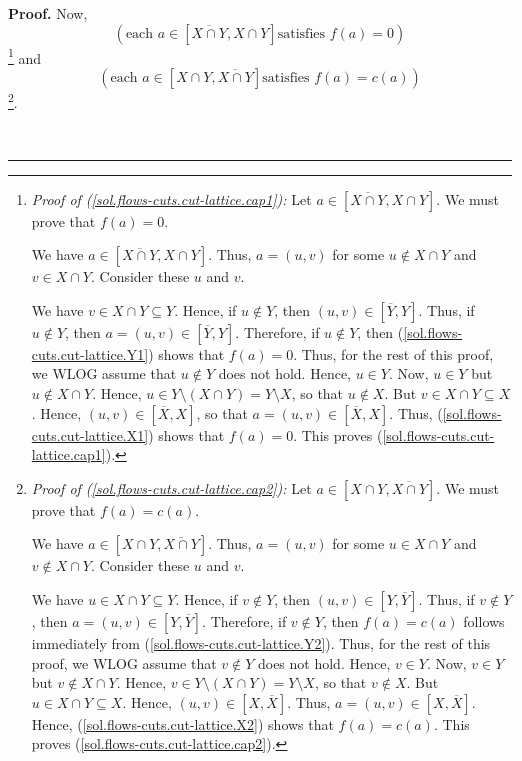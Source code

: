 \documentclass[numbers=enddot,12pt,final,onecolumn,notitlepage]{scrartcl}%
\theoremstyle{definition}
\newenvironment{proof}[1][Proof]{\noindent\textbf{#1.} }{\ \rule{0.5em}{0.5em}}
\begin{document}
\begin{proof}
Now,
\begin{equation}
\left(  \text{each }a\in\left[  \overline{X\cap Y},X\cap Y\right]  \text{
satisfies }f\left(  a\right)  =0\right)
\label{sol.flows-cuts.cut-lattice.cap1}%
\end{equation}
\footnote{\textit{Proof of (\ref{sol.flows-cuts.cut-lattice.cap1}):} Let
$a\in\left[  \overline{X\cap Y},X\cap Y\right]  $. We must prove that
$f\left(  a\right)  =0$.
\par
We have $a\in\left[  \overline{X\cap Y},X\cap Y\right]  $. Thus, $a=\left(
u,v\right)  $ for some $u\notin X\cap Y$ and $v\in X\cap Y$. Consider these
$u$ and $v$.
\par
We have $v\in X\cap Y\subseteq Y$. Hence, if $u\notin Y$, then $\left(
u,v\right)  \in\left[  \overline{Y},Y\right]  $. Thus, if $u\notin Y$, then
$a=\left(  u,v\right)  \in\left[  \overline{Y},Y\right]  $. Therefore, if
$u\notin Y$, then (\ref{sol.flows-cuts.cut-lattice.Y1}) shows that $f\left(
a\right)  =0$. Thus, for the rest of this proof, we WLOG assume that $u\notin
Y$ does not hold. Hence, $u\in Y$. Now, $u\in Y$ but $u\notin X\cap Y$. Hence,
$u\in Y\setminus\left(  X\cap Y\right)  =Y\setminus X$, so that $u\notin X$.
But $v\in X\cap Y\subseteq X$. Hence, $\left(  u,v\right)  \in\left[
\overline{X},X\right]  $, so that $a=\left(  u,v\right)  \in\left[
\overline{X},X\right]  $. Thus, (\ref{sol.flows-cuts.cut-lattice.X1}) shows
that $f\left(  a\right)  =0$. This proves
(\ref{sol.flows-cuts.cut-lattice.cap1}).} and%
\begin{equation}
\left(  \text{each }a\in\left[  X\cap Y,\overline{X\cap Y}\right]  \text{
satisfies }f\left(  a\right)  =c\left(  a\right)  \right)
\label{sol.flows-cuts.cut-lattice.cap2}%
\end{equation}
\footnote{\textit{Proof of (\ref{sol.flows-cuts.cut-lattice.cap2}):} Let
$a\in\left[  X\cap Y,\overline{X\cap Y}\right]  $. We must prove that
$f\left(  a\right)  =c\left(  a\right)  $.
\par
We have $a\in\left[  X\cap Y,\overline{X\cap Y}\right]  $. Thus, $a=\left(
u,v\right)  $ for some $u\in X\cap Y$ and $v\notin X\cap Y$. Consider these
$u$ and $v$.
\par
We have $u\in X\cap Y\subseteq Y$. Hence, if $v\notin Y$, then $\left(
u,v\right)  \in\left[  Y,\overline{Y}\right]  $. Thus, if $v\notin Y$, then
$a=\left(  u,v\right)  \in\left[  Y,\overline{Y}\right]  $. Therefore, if
$v\notin Y$, then $f\left(  a\right)  =c\left(  a\right)  $ follows
immediately from (\ref{sol.flows-cuts.cut-lattice.Y2}). Thus, for the rest of
this proof, we WLOG assume that $v\notin Y$ does not hold. Hence, $v\in Y$.
Now, $v\in Y$ but $v\notin X\cap Y$. Hence, $v\in Y\setminus\left(  X\cap
Y\right)  =Y\setminus X$, so that $v\notin X$. But $u\in X\cap Y\subseteq X$.
Hence, $\left(  u,v\right)  \in\left[  X,\overline{X}\right]  $. Thus,
$a=\left(  u,v\right)  \in\left[  X,\overline{X}\right]  $. Hence,
(\ref{sol.flows-cuts.cut-lattice.X2}) shows that $f\left(  a\right)  =c\left(
a\right)  $. This proves (\ref{sol.flows-cuts.cut-lattice.cap2}).}.


\end{proof}
\end{document}
